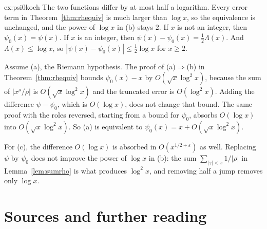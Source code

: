 \begin{solution}{ex:psi0koch}
\idea The two functions differ by at most half a logarithm. Every error term in Theorem~\ref{thm:rhequiv} is much larger than $\log x$, so the equivalence is unchanged, and the power of $\log x$ in (b) stays $2$.
\writeup If $x$ is not an integer, then $\psi_0(x)=\psi(x)$. If $x$ is an integer, then $\psi(x)-\psi_0(x)=\frac12\Lambda(x)$. And $\Lambda(x)\le\log x$, so $|\psi(x)-\psi_0(x)|\le\frac12\log x$ for $x\ge2$.

Assume (a), the Riemann hypothesis. The proof of (a)$\Rightarrow$(b) in Theorem~\ref{thm:rhequiv} bounds $\psi_0(x)-x$ by $O(\sqrt x\log^2x)$, because the sum of $|x^\rho/\rho|$ is $O(\sqrt x\log^2x)$ and the truncated error is $O(\log^2x)$. Adding the difference $\psi-\psi_0$, which is $O(\log x)$, does not change that bound. The same proof with the roles reversed, starting from a bound for $\psi_0$, absorbs $O(\log x)$ into $O(\sqrt x\log^2x)$. So (a) is equivalent to $\psi_0(x)=x+O(\sqrt x\log^2x)$.

For (c), the difference $O(\log x)$ is absorbed in $O(x^{1/2+\varepsilon})$ as well. Replacing $\psi$ by $\psi_0$ does not improve the power of $\log x$ in (b): the sum $\sum_{|\gamma|<x}1/|\rho|$ in Lemma~\ref{lem:sumrho} is what produces $\log^2x$, and removing half a jump removes only $\log x$.
\end{solution}

\section*{Sources and further reading}

